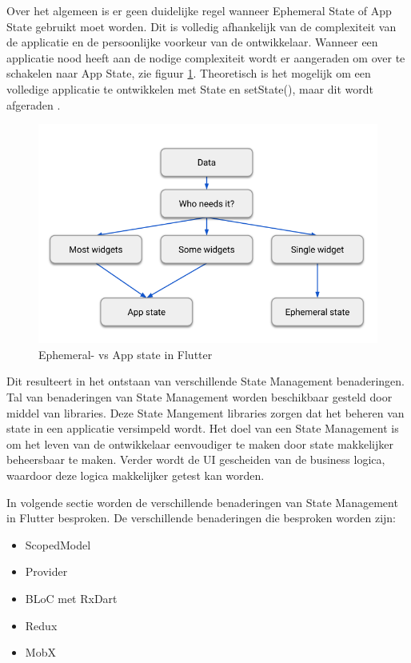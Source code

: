 Over het algemeen is er geen duidelijke regel wanneer Ephemeral State of App State gebruikt moet worden. Dit is volledig afhankelijk van de complexiteit van de applicatie en de persoonlijke voorkeur van de ontwikkelaar.
Wanneer een applicatie nood heeft aan de nodige complexiteit wordt er aangeraden om over te schakelen naar App State, zie figuur \ref{fig:ephemeral-vs-app-state-flutter}. Theoretisch is het mogelijk om een volledige applicatie te ontwikkelen met State en setState(), maar dit wordt afgeraden \autocite{Developers2019}.
\begin{figure}[H]
    \includegraphics[width=\linewidth]{img/stand-van-zaken/ephemeral-vs-app-state-flutter.png}
    \caption{Ephemeral- vs App state in Flutter \autocite{Developers2019}}
    \label{fig:ephemeral-vs-app-state-flutter}
\end{figure}

Dit resulteert in het ontstaan van verschillende State Management benaderingen. Tal van benaderingen van State Management worden beschikbaar gesteld door middel van libraries. Deze State Mangement libraries zorgen dat het beheren van state in een applicatie versimpeld wordt.
Het doel van een State Management is om het leven van de ontwikkelaar eenvoudiger te
maken door state makkelijker beheersbaar te maken. Verder wordt de UI gescheiden van
de business logica, waardoor deze logica makkelijker getest kan worden.

In volgende sectie worden de verschillende benaderingen van State Management in Flutter besproken.
De verschillende benaderingen die besproken worden zijn: 
\begin{itemize}
    \item ScopedModel
    \item Provider
    \item BLoC met RxDart
    \item Redux
    \item MobX
\end{itemize}


